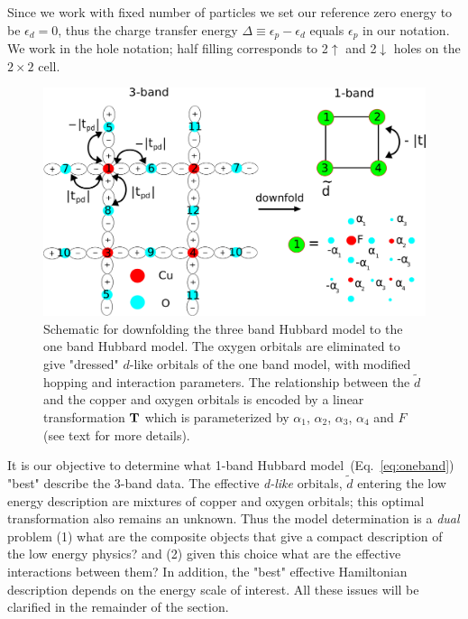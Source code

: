 Since we work with fixed number of particles we set our reference zero energy 
to be $\epsilon_d = 0$, thus the charge transfer energy $\Delta \equiv \epsilon_p - \epsilon_d$ equals $\epsilon_p$ in our notation. 
We work in the hole notation; half filling corresponds to 2$\uparrow$ and 2$\downarrow$ holes on the $2\times2$ cell.
\begin{figure}[htpb]
\centering
\includegraphics[width=0.8\linewidth]{./Figures/three_band_figure.eps}
\caption{Schematic for downfolding the three band Hubbard model to the one band Hubbard model. The oxygen orbitals are 
eliminated to give "dressed" $d$-like orbitals of the one band model, with modified hopping and interaction parameters. 
The relationship between the $\tilde{d}$ and the copper and oxygen orbitals is encoded by a linear transformation 
${\bf T}$ which is parameterized by $\alpha_1$, $\alpha_2$, $\alpha_3$, $\alpha_4$ and $F$ (see text for more details).}
\label{fig:threeband} 
\end{figure}	

It is our objective to determine what 1-band Hubbard model~(Eq.~\ref{eq:oneband}) 
"best" describe the 3-band data. The effective \textit{d-like} orbitals, $\tilde{d}$ entering the low energy description 
are mixtures of copper and oxygen orbitals; this optimal transformation also remains an unknown. 
Thus the model determination is a \emph{dual} problem (1) 
what are the composite objects that give a compact description of the low energy physics? and (2) 
given this choice what are the effective interactions between them? 
In addition, the "best" effective Hamiltonian description depends on the energy scale of interest. 
All these issues will be clarified in the remainder of the section. 


